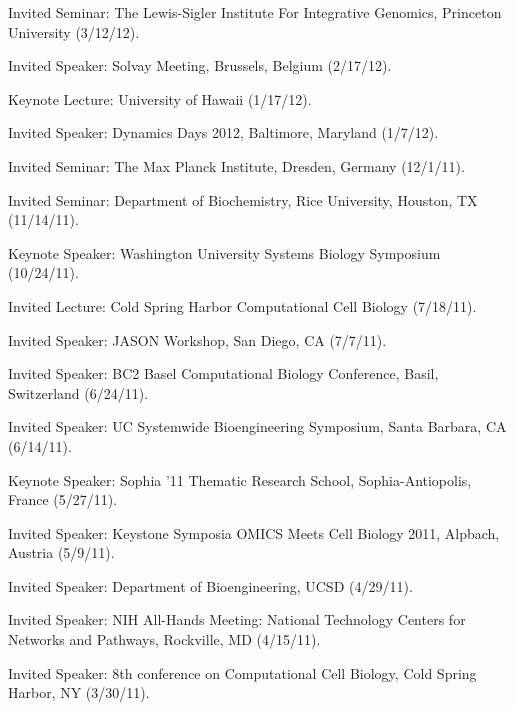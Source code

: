 \item Invited Seminar: The Lewis-Sigler Institute For Integrative Genomics, Princeton University (3/12/12). 

\item Invited Speaker: Solvay Meeting, Brussels, Belgium (2/17/12). 

\item Keynote Lecture: University of Hawaii (1/17/12). 

\item Invited Speaker: Dynamics Days 2012, Baltimore, Maryland (1/7/12). 

\item Invited Seminar: The Max Planck Institute, Dresden, Germany (12/1/11). 

\item Invited Seminar: Department of Biochemistry, Rice University, Houston, TX (11/14/11). 

\item Keynote Speaker: Washington University Systems Biology Symposium (10/24/11). 

\item Invited Lecture: Cold Spring Harbor Computational Cell Biology (7/18/11). 

\item Invited Speaker: JASON Workshop, San Diego, CA (7/7/11). 

\item Invited Speaker: BC2 Basel Computational Biology Conference, Basil, Switzerland (6/24/11). 

\item Invited Speaker: UC Systemwide Bioengineering Symposium, Santa Barbara, CA (6/14/11). 

\item Keynote Speaker: Sophia '11 Thematic Research School, Sophia-Antiopolis, France (5/27/11). 

\item Invited Speaker: Keystone Symposia OMICS Meets Cell Biology 2011, Alpbach, Austria (5/9/11). 

\item Invited Speaker: Department of Bioengineering, UCSD (4/29/11). 

\item Invited Speaker: NIH All-Hands Meeting: National Technology Centers for Networks and Pathways, Rockville, MD (4/15/11).

\item Invited Speaker: 8th conference on Computational Cell Biology, Cold Spring Harbor, NY (3/30/11). 

